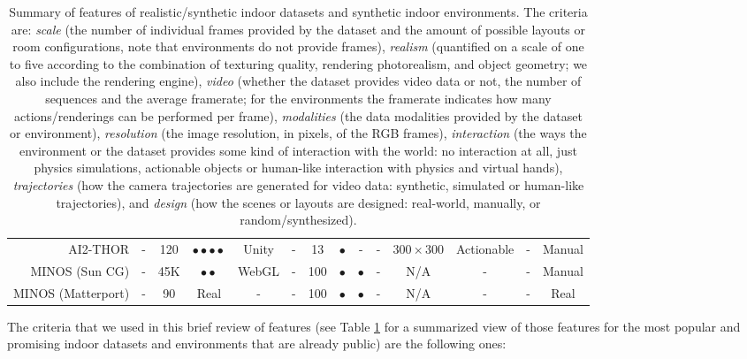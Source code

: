 \begin{table}[!t]
{\begin{tabular}{|r|c|c|c|c|c|c|c|c|c|c|c|c|c|}
        AI2-THOR \cite{Kolve2017} & - & 120 & $\bullet\bullet\bullet\bullet$ & Unity & - & 13 & $\bullet$ & - & - & $300\times300$ & Actionable & - & Manual\\
        MINOS (Sun CG) \cite{Savva2017} & - & 45K & $\bullet\bullet$ & WebGL & - & 100 & $\bullet$ & $\bullet$ & - & N/A &  - & - & Manual\\
        MINOS (Matterport) \cite{Savva2017} & - & 90 & Real & - & - & 100 & $\bullet$ & $\bullet$ & - & N/A &  - & - & Real\\
      \hline
      \end{tabular}
    }
    \label{table:dataset_features}
    \caption{Summary of features of realistic/synthetic indoor datasets and synthetic indoor environments. The criteria are: \emph{scale} (the number of individual frames provided by the dataset and the amount of possible layouts or room configurations, note that environments do not provide frames), \emph{realism} (quantified on a scale of one to five according to the combination of texturing quality, rendering photorealism, and object geometry; we also include the rendering engine), \emph{video} (whether the dataset provides video data or not, the number of sequences and the average framerate; for the environments the framerate indicates how many actions/renderings can be performed per frame), \emph{modalities} (the data modalities provided by the dataset or environment), \emph{resolution} (the image resolution, in pixels, of the RGB frames), \emph{interaction} (the ways the environment or the dataset provides some kind of interaction with the world: no interaction at all, just physics simulations, actionable objects or human-like interaction with physics and virtual hands), \emph{trajectories} (how the camera trajectories are generated for video data: synthetic, simulated or human-like trajectories), and \emph{design} (how the scenes or layouts are designed: real-world, manually, or random/synthesized).}
  \end{table}

The criteria that we used in this brief review of features (see Table \ref{table:dataset_features} for a summarized view of those features for the most popular and promising indoor datasets and environments that are already public) are the following ones:

